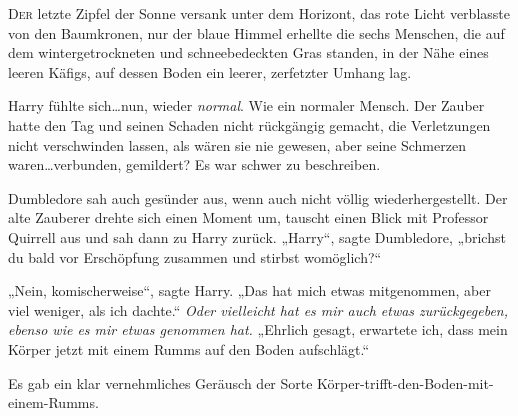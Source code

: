 
\lettrine{D}{er} letzte Zipfel der Sonne versank unter dem Horizont, das rote Licht verblasste von den Baumkronen, nur der blaue Himmel erhellte die sechs Menschen, die auf dem wintergetrockneten und schneebedeckten Gras standen, in der Nähe eines leeren Käfigs, auf dessen Boden ein leerer, zerfetzter Umhang lag.

Harry fühlte sich…nun, wieder \emph{normal}. Wie ein normaler Mensch. Der Zauber hatte den Tag und seinen Schaden nicht rückgängig gemacht, die Verletzungen nicht verschwinden lassen, als wären sie nie gewesen, aber seine Schmerzen waren…verbunden, gemildert? Es war schwer zu beschreiben.

Dumbledore sah auch gesünder aus, wenn auch nicht völlig wiederhergestellt. Der alte Zauberer drehte sich einen Moment um, tauscht einen Blick mit Professor Quirrell aus und sah dann zu Harry zurück. „Harry“, sagte Dumbledore, „brichst du bald vor Erschöpfung zusammen und stirbst womöglich?“

„Nein, komischerweise“, sagte Harry. „Das hat mich etwas mitgenommen, aber viel weniger, als ich dachte.“ \emph{Oder vielleicht hat es mir auch etwas zurückgegeben, ebenso wie es mir etwas genommen hat.} „Ehrlich gesagt, erwartete ich, dass mein Körper jetzt mit einem Rumms auf den Boden aufschlägt.“

Es gab ein klar vernehmliches Geräusch der Sorte Körper-trifft-den-Boden-mit-einem-Rumms.

